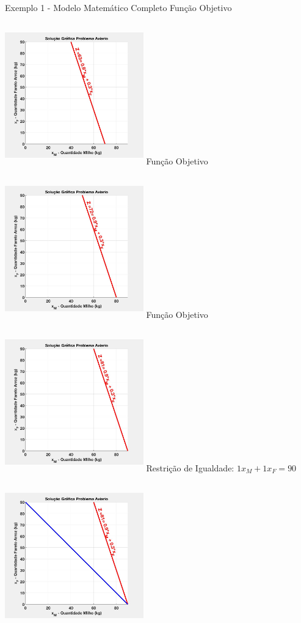 \documentclass{beamer}
\begin{document}
\begin{frame}
\begin{columns}
\begin{column}{0.8\textwidth}
\begin{exampleblock}{Exemplo 1 - Modelo Matemático Completo}
{				}
				\only<9>
				{	
					Função Objetivo \\~\\
					\includegraphics[width=6cm,height=6cm]{MatLab/aviario_7.png}
				}
				\only<10>
				{	
					Função Objetivo \\~\\
					\includegraphics[width=6cm,height=6cm]{MatLab/aviario_8.png}
				}
				\only<11>
				{	
					Função Objetivo \\~\\
					\includegraphics[width=6cm,height=6cm]{MatLab/aviario_9.png}
				}
				\only<12>
				{	
					Restrição de Igualdade: $1x_M+1x_F = 90$ \\~\\
					\includegraphics[width=6cm,height=6cm]{MatLab/aviario_10.png}
}
\end{exampleblock}
\end{column}
\end{columns}
\end{frame}
\end{document}
